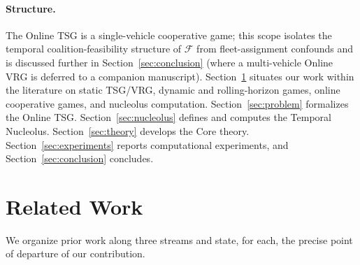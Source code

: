 \documentclass[11pt]{article}
\theoremstyle{plain}
\theoremstyle{definition}
\theoremstyle{remark}
\newcommand{\F}{\mathcal{F}}
\begin{document}
\paragraph{Structure.} The Online TSG is a single-vehicle cooperative game; this scope isolates the temporal coalition-feasibility structure of $\F$ from fleet-assignment confounds and is discussed further in Section~\ref{sec:conclusion} (where a multi-vehicle Online VRG is deferred to a companion manuscript). Section~\ref{sec:related} situates our work within the literature on static TSG/VRG, dynamic and rolling-horizon games, online cooperative games, and nucleolus computation. Section~\ref{sec:problem} formalizes the Online TSG. Section~\ref{sec:nucleolus} defines and computes the Temporal Nucleolus. Section~\ref{sec:theory} develops the Core theory. Section~\ref{sec:experiments} reports computational experiments, and Section~\ref{sec:conclusion} concludes.

\section{Related Work}
\label{sec:related}

We organize prior work along three streams and state, for each, the precise point of departure of our contribution.
\end{document}
